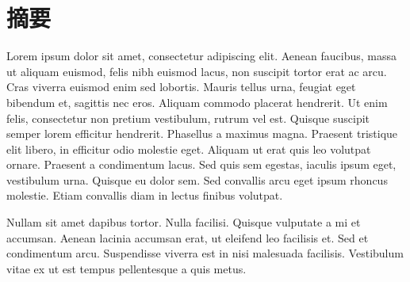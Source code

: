 \section*{\centering 摘要}
Lorem ipsum dolor sit amet, consectetur adipiscing elit. Aenean faucibus, massa ut aliquam euismod,
felis nibh euismod lacus, non suscipit tortor erat ac arcu. 
Cras viverra euismod enim sed lobortis.
Mauris tellus urna, feugiat eget bibendum et, sagittis nec eros. 
Aliquam commodo placerat hendrerit.
Ut enim felis, consectetur non pretium vestibulum, rutrum vel est.
Quisque suscipit semper lorem efficitur hendrerit. 
Phasellus a maximus magna. Praesent tristique elit libero, in efficitur odio molestie eget.
Aliquam ut erat quis leo volutpat ornare.
Praesent a condimentum lacus. Sed quis sem egestas, iaculis ipsum eget, vestibulum urna.
Quisque eu dolor sem. Sed convallis arcu eget ipsum rhoncus molestie.
Etiam convallis diam in lectus finibus volutpat.

Nullam sit amet dapibus tortor.
Nulla facilisi. Quisque vulputate a mi et accumsan.
Aenean lacinia accumsan erat, ut eleifend leo facilisis et.
Sed et condimentum arcu.
Suspendisse viverra est in nisi malesuada facilisis.
Vestibulum vitae ex ut est tempus pellentesque a quis metus.